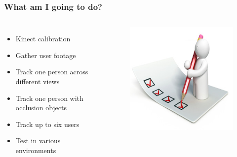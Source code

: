 \documentclass{beamer}
\begin{document}
\begin{frame}
\frametitle{What am I going to do?}
\begin{columns}[c]
\begin{itemize}
	\item Kinect calibration
	\item Gather user footage
	\item Track one person across different views
	\item Track one person with occlusion objects
	\item Track up to six users
	\item Test in various environments
\end{itemize}
\begin{figure}
\includegraphics[width=0.8\linewidth]{checklist}
\end{figure}
\end{columns}
\end{frame}
\end{document}

